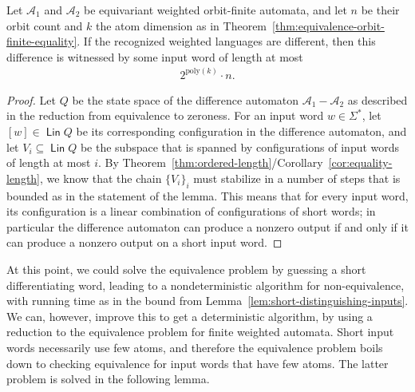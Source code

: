 \documentclass[10pt,a4paper]{amsart}
\numberwithin{equation}{section}
\newcommand{\set}[1]{\{#1\}}
\newcommand{\Aa}{{\mathcal A}}
\DeclareMathOperator{\lin}{\mathsf{Lin}}
\newcommand{\poly}[1]{\mathrm{poly}(#1)}
\begin{document}
\begin{lemma}\label{lem:short-distinguishing-inputs}
    Let $\Aa_1$ and $\Aa_2$ be equivariant weighted orbit-finite automata, and let $n$ be their orbit count and $k$ the atom dimension as in Theorem~\ref{thm:equivalence-orbit-finite-equality}. If the recognized weighted languages are different, then this difference is witnessed by some input word of length at most 
    \begin{align*}
         2^{\poly k} \cdot n.
        \end{align*}
\end{lemma}
\begin{proof}
    Let $Q$ be the state space of the difference automaton $\Aa_1 - \Aa_2$ as described in the reduction from equivalence to zeroness. 
     For an input word $w \in \Sigma^*$, let $[w] \in \lin Q$ be its corresponding configuration in the difference automaton, and let $V_i \subseteq \lin Q$ be the subspace that is spanned by configurations of  input words of length at most $i$.   
    By Theorem~\ref{thm:ordered-length}/Corollary~\ref{cor:equality-length}, we know that the chain $\set{V_i}_i$  must stabilize in a number of steps that is bounded as in the statement of the lemma.  This means that for every input word, its  configuration  is a  linear combination of configurations of short words; in particular the difference automaton can produce a nonzero output if and only if it can produce a nonzero output on a short input word.
\end{proof}

At this point, we could solve the equivalence problem by  guessing a short differentiating word, leading to a nondeterministic algorithm for non-equivalence, with running time as in the bound from Lemma~\ref{lem:short-distinguishing-inputs}. 
We can, however, improve this to get a deterministic algorithm, by using a reduction to the equivalence problem for finite weighted automata. 
Short input words necessarily use few atoms, and therefore the equivalence problem boils down to checking equivalence for input words that have few atoms. The latter problem is solved in the following lemma.
\end{document}

